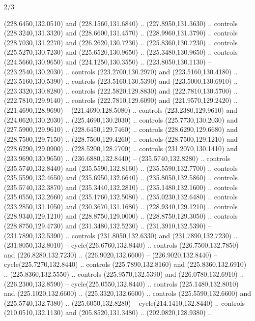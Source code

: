 \begin{flagdescription}{2/3}
\begin{scope}[xshift=0.5\flaglength,yshift=0.5\flagwidth,scale=\flagwidth/259.2]
\begin{scope}[y=0.8pt, x=0.8pt, yscale=-1,shift={(-243,-162)}]
      (228.6450,132.0510) and (228.1560,131.6840) .. (227.8950,131.3630) .. controls
      (228.3240,131.3320) and (228.6600,131.4570) .. (228.9960,131.3790) .. controls
      (228.7030,131.2270) and (226.2620,130.7230) .. (225.8360,130.7230) .. controls
      (225.5270,130.7230) and (225.6520,130.9650) .. (225.3480,130.9650) .. controls
      (224.5660,130.9650) and (224.1250,130.3550) .. (223.8050,130.1130) --
      (223.2540,130.2030) .. controls (223.2700,130.2970) and (223.5160,130.4180) ..
      (223.5160,130.5390) .. controls (223.5160,130.5390) and (223.5000,130.6910) ..
      (223.3320,130.8280) .. controls (222.5820,129.8830) and (222.7810,130.5700) ..
      (222.7810,129.9140) .. controls (222.7810,129.6090) and (221.9570,129.2420) ..
      (221.4690,128.9690) -- (221.4690,128.5080) .. controls (223.2380,129.9610) and
      (224.0620,130.2030) .. (225.4690,130.2030) .. controls (225.7730,130.2030) and
      (227.5900,129.9610) .. (228.6450,129.7460) .. controls (228.6290,129.6680) and
      (228.7500,129.7150) .. (228.7500,129.4260) .. controls (228.7500,129.1210) and
      (228.6290,129.0900) .. (228.5200,128.7700) .. controls (231.2070,130.1410) and
      (233.9690,130.9650) .. (236.6880,132.8440) -- (235.5740,132.8280) .. controls
      (235.5740,132.8440) and (235.5590,132.8160) .. (235.5590,132.7700) .. controls
      (235.5590,132.4650) and (235.6950,132.6640) .. (235.8050,132.5860) .. controls
      (235.5740,132.3870) and (235.3440,132.2810) .. (235.1480,132.1600) .. controls
      (235.0550,132.2660) and (235.1760,132.5080) .. (235.0230,132.6480) .. controls
      (233.2850,131.1050) and (230.3670,131.1680) .. (228.9340,129.1210) .. controls
      (228.9340,129.1210) and (228.8750,129.0000) .. (228.8750,129.3050) .. controls
      (228.8750,129.4730) and (231.3480,132.5230) .. (231.3910,132.5390) --
      (231.7890,132.5390) .. controls (231.8050,132.6330) and (231.7890,132.7230) ..
      (231.8050,132.8010) -- cycle(226.6760,132.8440) .. controls
      (226.7500,132.7850) and (226.8280,132.7230) .. (226.9020,132.6600) --
      (226.9020,132.8440) -- cycle(225.7270,132.8440) .. controls
      (225.7890,132.8160) and (225.8360,132.6910) .. (225.8360,132.5550) .. controls
      (225.9570,132.5390) and (226.0780,132.6910) .. (226.2300,132.8590) --
      cycle(225.0550,132.8440) .. controls (225.1480,132.8010) and
      (225.1020,132.6600) .. (225.3320,132.6600) .. controls (225.5590,132.6600) and
      (225.5740,132.7380) .. (225.6050,132.8280) -- cycle(214.1410,132.8440) ..
      controls (210.0510,132.1130) and (205.8520,131.3480) .. (202.0820,128.9380) ..

\end{scope}
\end{scope}
\end{flagdescription}
